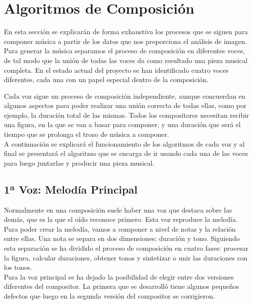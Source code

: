 \section{Algoritmos de Composición}
\label{sec:algComposicion}


En esta sección se explicarán de forma exhaustiva los procesos que se siguen para componer música a partir de los datos que nos proporciona el análisis de imagen.\\

Para generar la música separamos el proceso de composición en diferentes voces, de tal modo que la unión de todas las voces da como resultado una pieza musical completa. En el estado actual del proyecto se han identificado cuatro voces diferentes, cada una con un papel especial dentro de la composición. 

Cada voz sigue un proceso de composición independiente, aunque concuerdan en algunos aspectos para poder realizar una unión correcta de todas ellas, como por ejemplo, la duración total de las mismas. Todos los compositores necesitan recibir una figura, en la que se van a basar para componer, y una duración que será el tiempo que se prolonga el trozo de música a componer.\\

A continuación se explicará el funcionamiento de los algoritmos de cada voz y al final se presentará el algoritmo que se encarga de ir usando cada una de las voces para luego juntarlas y producir una pieza musical.

\subsection{1ª Voz: Melodía Principal}

Normalmente en una composición suele haber una voz que destaca sobre las demás, que es la que el oído reconoce primero. Esta voz reproduce la melodía. Para poder crear la melodía, vamos a componer a nivel de notas y la relación entre ellas. Una nota se separa en dos dimensiones: duración y tono. Siguiendo esta separación se ha dividido el proceso de composición en cuatro fases: procesar la figura, calcular duraciones, obtener tonos y sintetizar o unir las duraciones con los tonos.\\
Para la voz principal se ha dejado la posibilidad de elegir entre dos versiones diferentes del compositor. La primera que se desarrolló tiene algunos pequeños defectos que luego en la segunda versión del compositor se corrigieron.\\

